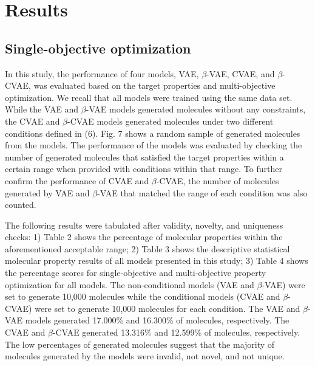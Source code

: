 \chapter{Results}
\section{Single-objective optimization}
In this study, the performance of four models, VAE, $\beta$-VAE, CVAE, and $\beta$-CVAE, was evaluated based on the target properties and multi-objective optimization. We recall that all models were trained using the same data set. While the VAE and $\beta$-VAE models generated molecules without any constraints, the CVAE and $\beta$-CVAE models generated molecules under two different conditions defined in (6). Fig. 7 shows a random sample of generated molecules from the models. The performance of the models was evaluated by checking the number of generated molecules that satisfied the target properties within a certain range when provided with conditions within that range. To further confirm the performance of CVAE and $\beta$-CVAE, the number of molecules generated by VAE and $\beta$-VAE that matched the range of each condition was also counted.

The following results were tabulated after validity, novelty, and uniqueness checks: 1) Table 2 shows the percentage of molecular properties within the aforementioned acceptable range; 2) Table 3 shows the descriptive statistical molecular property results of all models presented in this study; 3) Table 4 shows the percentage scores for single-objective and multi-objective property optimization for all models. The non-conditional models (VAE and $\beta$-VAE) were set to generate 10,000 molecules while the conditional models (CVAE and $\beta$-CVAE) were set to generate 10,000 molecules for each condition. The VAE and $\beta$-VAE models generated 17.000\% and 16.300\% of molecules, respectively. The CVAE and $\beta$-CVAE generated 13.316\% and 12.599\% of molecules, respectively. The low percentages of generated molecules suggest that the majority of molecules generated by the models were invalid, not novel, and not unique. 

\begin{table}[htbp]
\caption{Molecular properties within range}
\centering
{}
\end{table}

